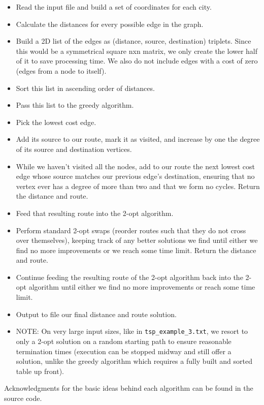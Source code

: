 \documentclass[paper=a4, fontsize=11pt]{scrartcl} %
\numberwithin{equation}{section} %
\numberwithin{figure}{section} %
\numberwithin{table}{section} %
\begin{document}
\begin{itemize}

  \item Read the input file and build a set of coordinates for each city.
  \item Calculate the distances for every possible edge in the graph.  
  \item Build a 2D list of the edges as (distance, source, destination) triplets. Since this would be a symmetrical square nxn matrix, we only create the lower half of it to save processing time. We also do not include edges with a cost of zero (edges from a node to itself).
  \item Sort this list in ascending order of distances.
  \item Pass this list to the greedy algorithm.
  \item Pick the lowest cost edge.
  \item Add its source to our route, mark it as visited, and increase by one the degree of its source and destination vertices.
  \item While we haven't visited all the nodes, add to our route the next lowest cost edge whose source matches our previous edge's destination, ensuring that no vertex ever has a degree of more than two and that we form no cycles. Return the distance and route.
  \item Feed that resulting route into the 2-opt algorithm.
  \item Perform standard 2-opt swaps (reorder routes such that they do not cross over themselves), keeping track of any better solutions we find until either we find no more improvements or we reach some time limit. Return the distance and route.
  \item Continue feeding the resulting route of the 2-opt algorithm back into the 2-opt algorithm until either we find no more improvements or reach some time limit.
  \item Output to file our final distance and route solution.
  \item NOTE: On very large input sizes, like in \verb|tsp_example_3.txt|, we resort to only a 2-opt solution on a random starting path to ensure reasonable termination times (execution can be stopped midway and still offer a solution, unlike the greedy algorithm which requires a fully built and sorted table up front).

\end{itemize}

Acknowledgments for the basic ideas behind each algorithm can be found in the source code.\newline
\end{document}
